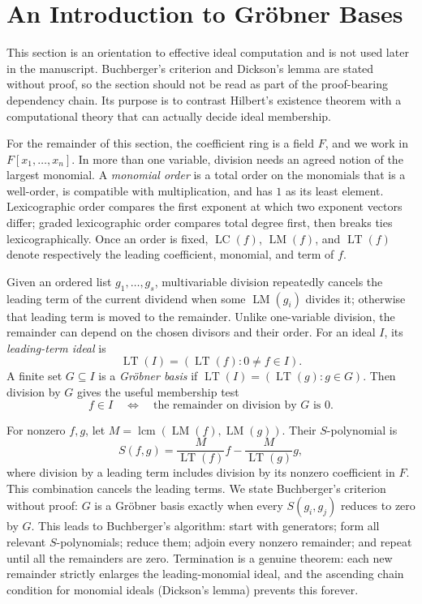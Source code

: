 \section{An Introduction to Gr\"obner Bases}
\begin{remark}
This section is an orientation to effective ideal computation and is not used
later in the manuscript.  Buchberger's criterion and Dickson's lemma are
stated without proof, so the section should not be read as part of the
proof-bearing dependency chain.  Its purpose is to contrast Hilbert's
existence theorem with a computational theory that can actually decide ideal
membership.
\end{remark}
For the remainder of this section, the coefficient ring is a field \(F\), and
we work in \(F[x_1,\ldots,x_n]\).  In more than one variable, division needs
an agreed notion of the largest monomial.  A \emph{monomial order} is a total
order on the monomials that is a well-order, is compatible with
multiplication, and has \(1\) as its least element.  Lexicographic order compares the
first exponent at which two exponent vectors differ; graded lexicographic
order compares total degree first, then breaks ties lexicographically.  Once
an order is fixed, \(\operatorname{LC}(f)\), \(\operatorname{LM}(f)\), and
\(\operatorname{LT}(f)\) denote respectively the leading coefficient,
monomial, and term of \(f\).

Given an ordered list \(g_1,\ldots,g_s\), multivariable division repeatedly
cancels the leading term of the current dividend when some
\(\operatorname{LM}(g_i)\) divides it; otherwise that leading term is moved
to the remainder.  Unlike one-variable division, the remainder can depend on
the chosen divisors and their order.  For an ideal \(I\), its
\emph{leading-term ideal} is
\[\operatorname{LT}(I)=(\operatorname{LT}(f):0\ne f\in I).\]
A finite set \(G\subseteq I\) is a \emph{Gr\"obner basis} if
\(\operatorname{LT}(I)=(\operatorname{LT}(g):g\in G)\).  Then division by
\(G\) gives the useful membership test
\[f\in I\quad\Longleftrightarrow\quad\text{the remainder on division by }G
\text{ is }0.\]

For nonzero \(f,g\), let \(M=\operatorname{lcm}(\operatorname{LM}(f),
\operatorname{LM}(g))\).  Their \(S\)-polynomial is
\[
S(f,g)=\frac{M}{\operatorname{LT}(f)}f-
\frac{M}{\operatorname{LT}(g)}g,
\]
where division by a leading term includes division by its nonzero coefficient
in \(F\).  This combination cancels the leading terms.  We state Buchberger's criterion without proof: \(G\) is a Gr\"obner basis
exactly when every \(S(g_i,g_j)\) reduces to zero by \(G\).  This leads to
Buchberger's algorithm: start with generators; form all relevant
\(S\)-polynomials; reduce them; adjoin every nonzero remainder; and repeat
until all the remainders are zero.  Termination is a genuine theorem: each
new remainder strictly enlarges the leading-monomial ideal, and the ascending
chain condition for monomial ideals (Dickson's lemma) prevents this forever.

